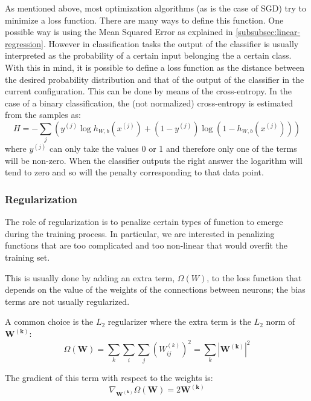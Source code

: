 As mentioned above, most optimization algorithms (as is the case of SGD) try to minimize a loss function. There are many ways to define this function. One possible way is using the Mean Squared Error as explained in \ref{subsubsec:linear-regression}. However in classification tasks the output of the classifier is usually interpreted as the probability of a certain input belonging the a certain class. With this in mind, it is possible to define a loss function as the distance between the desired probability distribution and that of the output of the classifier in the current configuration. This can be done by means of the cross-entropy. In the case of a binary classification, the (not normalized) cross-entropy is estimated from the samples as:
\begin{equation}
H = - \sum_j \left( y^{(j)} \log h_{W,b} \left( x^{(j)} \right) + (1 - y^{(j)}) \log \left( 1 - h_{W,b}\left( x^{(j)} \right) \right) \right)
\end{equation}
where $y^{(j)}$ can only take the values 0 or 1 and therefore only one of the terms will be non-zero. When the classifier outputs the right answer the logarithm will tend to zero and so will the penalty corresponding to that data point. \cite{murphy2012machine}

\subsubsection{Regularization}
The role of regularization is to penalize certain types of function to emerge during the training process. In particular, we are interested in penalizing functions that are too complicated and too non-linear that would overfit the training set.

This is usually done by adding an extra term, $\Omega \left( W \right) $, to the loss function that depends on the value of the weights of the connections between neurons; the bias terms are not usually regularized.

A common choice is the $L_2$ regularizer where the extra term is the $L_2$ norm of $\mathbf{W^{(k)}}$:
\begin{equation}
\Omega \left( \mathbf{W} \right) = \sum_k \sum_i \sum_j \left( W_{ij}^{(k)} \right)^2 = \sum_k |\mathbf{W^{(k)}} | ^2
\label{eq:L2-reg}
\end{equation}

The gradient of this term with respect to the weights is:
\begin{equation}
\nabla_{\mathbf{W^{(k)}}} \Omega \left( \mathbf{W} \right) = 2 \mathbf{W^{(k)}}
\label{eq:L2-reg-grad}
\end{equation}

